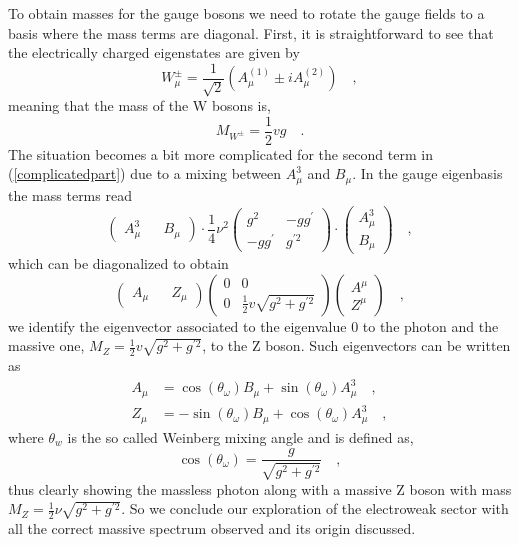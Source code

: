 %
To obtain masses for the gauge bosons we need to rotate the gauge fields to a basis where the mass terms are diagonal. First, it is straightforward to see that the electrically charged eigenstates are given by %
\begin{equation}
W^\pm_\mu = \frac{1}{\sqrt{2}} (A^{(1)}_\mu \pm i A^{(2)}_\mu) \quad , 
\label{gagestate}
\end{equation}
meaning that the mass of the W bosons is, 
\begin{equation}
M_{W^\pm}= \frac{1}{2} v g \quad .
\end{equation}
The situation becomes a bit more complicated for the second term in (\ref{complicatedpart}) due to a mixing between $A_\mu^3$ and $B_\mu$. In the gauge eigenbasis the mass terms read
\begin{equation}
\begin{pmatrix}
A_\mu^3 && B_\mu
\end{pmatrix} \cdot  \frac{1}{4} \nu ^2 \begin{pmatrix}
g^2  & -g g^\prime \\
-g g^\prime & g^{\prime 2} 
\end{pmatrix} \cdot \begin{pmatrix}
A_\mu^3 \\  B_\mu
\end{pmatrix}  \quad , 
\end{equation} 
which can be diagonalized to obtain
\begin{equation}
\begin{pmatrix}
A_\mu && Z_\mu 
\end{pmatrix} \begin{pmatrix}
0  & 0 \\
0  & \frac{1}{2} v \sqrt{g^2 + g^{\prime 2}} 
\end{pmatrix}  \begin{pmatrix}
A^\mu \\ Z^\mu
\end{pmatrix}  \quad , 
\end{equation}
%
we identify the eigenvector associated to the eigenvalue 0 to the photon and the massive one, $ M_Z =  \frac{1}{2} v \sqrt{g^2 + g^{\prime 2}} $, to the Z boson. Such eigenvectors can be written as
%
\begin{align}
A_\mu &=\cos(\theta_\omega) B_\mu + \sin(\theta_\omega) A_\mu^3 \quad ,  \\  
Z_\mu & =- \sin(\theta_\omega) B_\mu + \cos(\theta_\omega) A_\mu^3 \quad , 
\end{align}
%
where $\theta_w$ is the so called Weinberg mixing angle and is defined as, 
\begin{equation}
\cos(\theta_\omega)=\frac{g}{ \sqrt{g^2 + g^{\prime 2}}} \quad , 
\end{equation}
thus clearly showing the massless photon along with a massive Z boson with mass $M_Z= \frac{1}{2} \nu \sqrt{g^2 + g^{\prime 2}} $. 
%
So we conclude our exploration of the electroweak sector with all the correct massive spectrum observed and its origin discussed.


